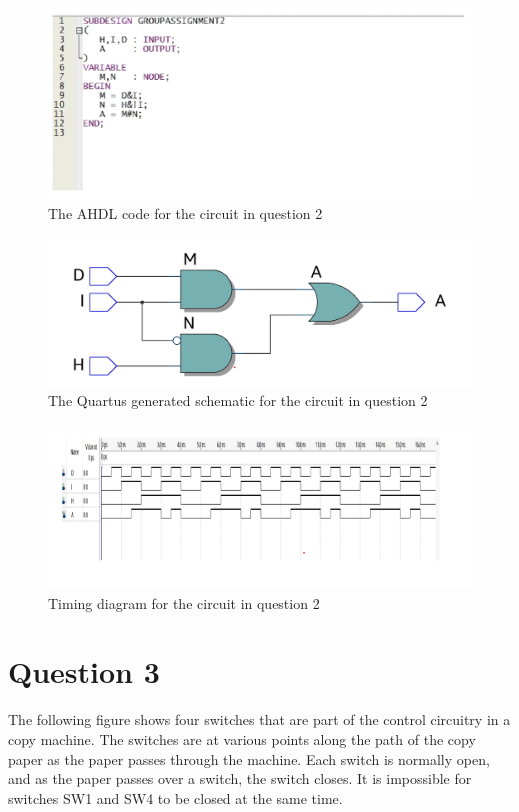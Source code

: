 \documentclass[a4paper,12]{article}
\begin{document}
\begin{figure}[H]
    \centering
    \includegraphics[width=\linewidth]{q2code.png}
    \caption{ The AHDL code for the circuit in question 2}
    \label{fig:q2code}    
\end{figure}
\begin{figure}[H]
    \centering
    \includegraphics[width=\linewidth]{q2schem.png}
    \caption{ The Quartus generated schematic for the circuit in question 2}
    \label{fig:q2schem}    
\end{figure}
\begin{figure}[H]
    \centering
    \includegraphics[width=\linewidth]{q2timi.png}
    \caption{   Timing diagram for the circuit in question 2}
    \label{fig:q2timi}    
\end{figure}



\newpage
\section*{Question 3}
The following figure shows four switches that are part of the control circuitry in a
copy machine. The switches are at various points along the path of the copy
paper as the paper passes through the machine. Each switch is normally open,
and as the paper passes over a switch, the switch closes. It is impossible for
switches SW1 and SW4 to be closed at the same time.
\end{document}
